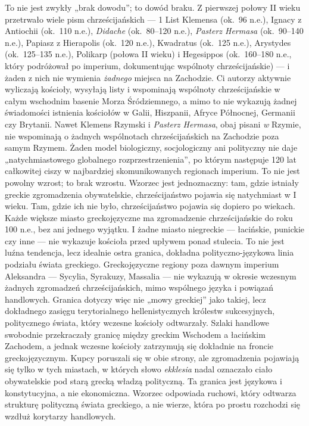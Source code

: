 To nie jest zwykły „brak dowodu”; to dowód braku.
Z pierwszej połowy II wieku przetrwało wiele pism chrześcijańskich — 1 List Klemensa (ok.~96 n.e.), Ignacy z Antiochii (ok.~110 n.e.), \textit{Didache} (ok.~80–120 n.e.), \textit{Pasterz Hermasa} (ok.~90–140 n.e.), Papiasz z Hierapolis (ok.~120 n.e.), Kwadratus (ok.~125 n.e.), Arystydes (ok.~125–135 n.e.), Polikarp (połowa II wieku) i Hegesippos (ok.~160–180 n.e., który podróżował po imperium, dokumentując wspólnoty chrześcijańskie) — i żaden z nich nie wymienia \emph{żadnego} miejsca na Zachodzie.
Ci autorzy aktywnie wyliczają kościoły, wysyłają listy i wspominają wspólnoty chrześcijańskie w całym wschodnim basenie Morza Śródziemnego, a mimo to nie wykazują żadnej świadomości istnienia kościołów w Galii, Hiszpanii, Afryce Północnej, Germanii czy Brytanii.
Nawet Klemens Rzymski i \textit{Pasterz Hermasa}, obaj pisani \emph{w} Rzymie, nie wspominają o żadnych wspólnotach chrześcijańskich na Zachodzie poza samym Rzymem.
Żaden model biologiczny, socjologiczny ani polityczny nie daje „natychmiastowego globalnego rozprzestrzenienia”, po którym następuje 120 lat całkowitej ciszy w najbardziej skomunikowanych regionach imperium.
To nie jest powolny wzrost; to brak wzrostu.
Wzorzec jest jednoznaczny: tam, gdzie istniały greckie zgromadzenia obywatelskie, chrześcijaństwo pojawia się natychmiast w I wieku.
Tam, gdzie ich nie było, chrześcijaństwo pojawia się dopiero po wiekach.
Każde większe miasto greckojęzyczne ma zgromadzenie chrześcijańskie do roku 100 n.e., bez ani jednego wyjątku.
I żadne miasto niegreckie — łacińskie, punickie czy inne — nie wykazuje kościoła przed upływem ponad stulecia.
To nie jest luźna tendencja, lecz idealnie ostra granica, dokładna polityczno-językowa linia podziału świata greckiego.
Greckojęzyczne regiony poza dawnym imperium Aleksandra — Sycylia, Syrakuzy, Massalia — nie wykazują w okresie wczesnym żadnych zgromadzeń chrześcijańskich, mimo wspólnego języka i powiązań handlowych.
Granica dotyczy więc nie „mowy greckiej” jako takiej, lecz dokładnego zasięgu terytorialnego hellenistycznych królestw sukcesyjnych, politycznego świata, który wczesne kościoły odtwarzały.
Szlaki handlowe swobodnie przekraczały granicę między greckim Wschodem a łacińskim Zachodem, a jednak wczesne kościoły zatrzymują się dokładnie na froncie greckojęzycznym.
Kupcy poruszali się w obie strony, ale zgromadzenia pojawiają się tylko w tych miastach, w których słowo \textit{ekklesia} nadal oznaczało ciało obywatelskie pod starą grecką władzą polityczną.
Ta granica jest językowa i konstytucyjna, a nie ekonomiczna.
Wzorzec odpowiada ruchowi, który odtwarza strukturę polityczną świata greckiego, a nie wierze, która po prostu rozchodzi się wzdłuż korytarzy handlowych.

